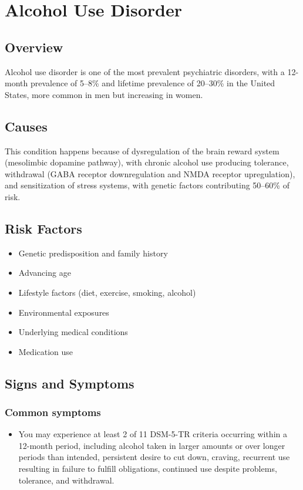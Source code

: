 \chapter{Alcohol Use Disorder}
\label{sec:Alcohol Use Disorder}

\section{Overview}
Alcohol use disorder is one of the most prevalent psychiatric disorders, with a 12-month prevalence of 5--8\% and lifetime prevalence of 20--30\% in the United States, more common in men but increasing in women.
\section{Causes}
This condition happens because of dysregulation of the brain reward system (mesolimbic dopamine pathway), with chronic alcohol use producing tolerance, withdrawal (GABA receptor downregulation and NMDA receptor upregulation), and sensitization of stress systems, with genetic factors contributing 50--60\% of risk.     
\section{Risk Factors}

\begin{itemize}[noitemsep]
  \item Genetic predisposition and family history
  \item Advancing age
  \item Lifestyle factors (diet, exercise, smoking, alcohol)
  \item Environmental exposures
  \item Underlying medical conditions
  \item Medication use
\end{itemize}
\section{Signs and Symptoms}

\subsection{Common symptoms}
\begin{itemize}[noitemsep]
  \item You may experience at least 2 of 11 DSM-5-TR criteria occurring within a 12-month period, including alcohol taken in larger amounts or over longer periods than intended, persistent desire to cut down, craving, recurrent use resulting in failure to fulfill obligations, continued use despite problems, tolerance, and withdrawal. 
  \end{itemize}

